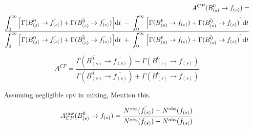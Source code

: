 {\small
\begin{eqnarray}
A^{CP} (B^0_{(s)} \to f_{(s)})  = &  \nonumber \\
\frac{ \displaystyle \int_0^\infty \Big[ \Gamma(B^0_{(s)} \to \bar{f_{(s)}}) + \Gamma(\bar{B^0_{(s)}} \to \bar{f_{(s)}}) \Big]
{\rm d}t \;-\; \int_0^\infty \Big[ \Gamma(B^0_{(s)} \to f_{(s)}) + \Gamma(\bar{B^0_{(s)}} \to f_{(s)}) \Big]
{\rm d}t}{ \displaystyle \int_0^\infty \Big[ \Gamma(B^0_{(s)} \to \bar{f_{(s)}}) + \Gamma(\bar{B^0_{(s)}} \to \bar{f_{(s)}}) \Big] {\rm d}t
 \;+\; \int_0^\infty \Big[ \Gamma(B^0_{(s)} \to f_{(s)}) + \Gamma(\bar{B^0_{(s)}} \to f_{(s)}) \Big] {\rm d}t}  &
\label{decayrates}
\end{eqnarray}
 }

\begin{equation}
A^{CP} = \frac{\Gamma(\bar{B^0_{(s)}} \to \bar{f_{(s)}})-\Gamma(B^0_{(s)} \to f_{(s)})}{\Gamma(\bar{B^0_{(s)}} \to \bar{f_{(s)}})+ \Gamma(B^0_{(s)} \to f_{(s)})}
\end{equation}

{\color{red} Assuming negligible cpv in mixing, Mention this.}

\begin{equation}
A_{CP}^{\rm raw}(B^0_{(s)} \to f_{(s)}) = \frac{N^{\rm obs}(\bar{f_{(s)}}) -N^{\rm obs}(f_{(s)}) }{
N^{\rm obs}(\bar{f_{(s)}}) + N^{\rm obs}(f_{(s)})}
\label{acp_mes}
\end{equation}
